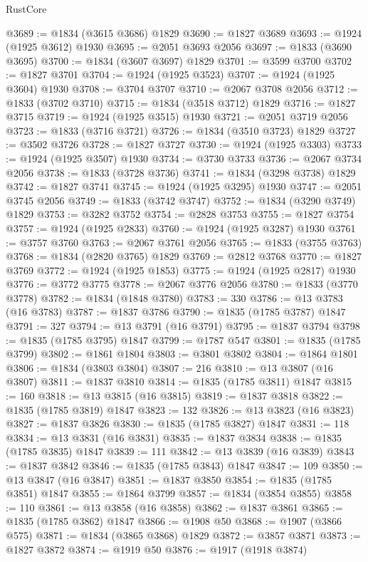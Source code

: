 \begin{lexlean}{RustCore}
\begin{coremodule}
@3689 := @1834 (@3615 @3686) @1829
@3690 := @1827 @3689
@3693 := @1924 (@1925 @3612) @1930
@3695 := @2051 @3693 @2056
@3697 := @1833 (@3690 @3695)
@3700 := @1834 (@3607 @3697) @1829
@3701 := @3599 @3700
@3702 := @1827 @3701
@3704 := @1924 (@1925 @3523)
@3707 := @1924 (@1925 @3604) @1930
@3708 := @3704 @3707
@3710 := @2067 @3708 @2056
@3712 := @1833 (@3702 @3710)
@3715 := @1834 (@3518 @3712) @1829
@3716 := @1827 @3715
@3719 := @1924 (@1925 @3515) @1930
@3721 := @2051 @3719 @2056
@3723 := @1833 (@3716 @3721)
@3726 := @1834 (@3510 @3723) @1829
@3727 := @3502 @3726
@3728 := @1827 @3727
@3730 := @1924 (@1925 @3303)
@3733 := @1924 (@1925 @3507) @1930
@3734 := @3730 @3733
@3736 := @2067 @3734 @2056
@3738 := @1833 (@3728 @3736)
@3741 := @1834 (@3298 @3738) @1829
@3742 := @1827 @3741
@3745 := @1924 (@1925 @3295) @1930
@3747 := @2051 @3745 @2056
@3749 := @1833 (@3742 @3747)
@3752 := @1834 (@3290 @3749) @1829
@3753 := @3282 @3752
@3754 := @2828 @3753
@3755 := @1827 @3754
@3757 := @1924 (@1925 @2833)
@3760 := @1924 (@1925 @3287) @1930
@3761 := @3757 @3760
@3763 := @2067 @3761 @2056
@3765 := @1833 (@3755 @3763)
@3768 := @1834 (@2820 @3765) @1829
@3769 := @2812 @3768
@3770 := @1827 @3769
@3772 := @1924 (@1925 @1853)
@3775 := @1924 (@1925 @2817) @1930
@3776 := @3772 @3775
@3778 := @2067 @3776 @2056
@3780 := @1833 (@3770 @3778)
@3782 := @1834 (@1848 @3780)
@3783 := 330
@3786 := @13 @3783 (@16 @3783)
@3787 := @1837 @3786
@3790 := @1835 (@1785 @3787) @1847
@3791 := 327
@3794 := @13 @3791 (@16 @3791)
@3795 := @1837 @3794
@3798 := @1835 (@1785 @3795) @1847
@3799 := @1787 @547
@3801 := @1835 (@1785 @3799)
@3802 := @1861 @1804
@3803 := @3801 @3802
@3804 := @1864 @1801
@3806 := @1834 (@3803 @3804)
@3807 := 216
@3810 := @13 @3807 (@16 @3807)
@3811 := @1837 @3810
@3814 := @1835 (@1785 @3811) @1847
@3815 := 160
@3818 := @13 @3815 (@16 @3815)
@3819 := @1837 @3818
@3822 := @1835 (@1785 @3819) @1847
@3823 := 132
@3826 := @13 @3823 (@16 @3823)
@3827 := @1837 @3826
@3830 := @1835 (@1785 @3827) @1847
@3831 := 118
@3834 := @13 @3831 (@16 @3831)
@3835 := @1837 @3834
@3838 := @1835 (@1785 @3835) @1847
@3839 := 111
@3842 := @13 @3839 (@16 @3839)
@3843 := @1837 @3842
@3846 := @1835 (@1785 @3843) @1847
@3847 := 109
@3850 := @13 @3847 (@16 @3847)
@3851 := @1837 @3850
@3854 := @1835 (@1785 @3851) @1847
@3855 := @1864 @3799
@3857 := @1834 (@3854 @3855)
@3858 := 110
@3861 := @13 @3858 (@16 @3858)
@3862 := @1837 @3861
@3865 := @1835 (@1785 @3862) @1847
@3866 := @1908 @50
@3868 := @1907 (@3866 @575)
@3871 := @1834 (@3865 @3868) @1829
@3872 := @3857 @3871
@3873 := @1827 @3872
@3874 := @1919 @50
@3876 := @1917 (@1918 @3874)

\end{coremodule}
\end{lexlean}
